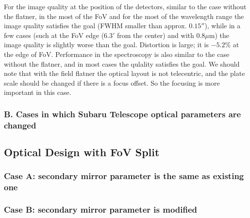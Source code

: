 For the image quality at the position of the detectors, similar to the
case without the flatner, in the most of the FoV and for the most of the
wavelength range the image quality satisfies the goal (FWHM smaller than
approx. $0.15''$), while in a few cases (such at the FoV edge ($6.3'$
from the center) and with 0.8$\mu$m) the image quality is slightly worse
than the goal. Distortion is large; it is $-5.2$\% at the edge of FoV.
Performance in the spectroscopy is also similar to the case without the
flatner, and in most cases the qulality satisfies the goal.
We should note that with the field flatner the optical layout is not
telecentric, and the plate scale should be changed if there is a focus
offset.  So the focusing is more important in this case.




\subsubsection{B. Cases in which Subaru Telescope optical parameters are
   changed}


\subsection{Optical Design with FoV Split}

\subsubsection{Case A: secondary mirror parameter is the same as
   existing one}

\subsubsection{Case B: secondary mirror parameter is modified}


